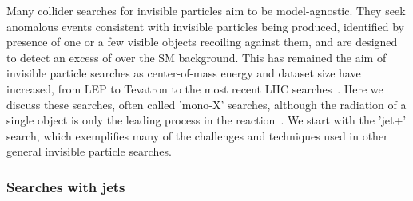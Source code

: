 

Many collider searches for invisible particles aim to be model-agnostic. They seek anomalous events consistent with invisible particles being produced, identified by presence of one or a few visible objects recoiling against them, and are designed to detect an excess of \MET over the SM background. 
This has remained the aim of invisible particle searches as center-of-mass energy and dataset size have increased, from LEP to Tevatron to the most recent LHC searches~\cite{Fox:2011fx,Beltran:2010ww,Bai:2010hh}.
Here we discuss these searches, often called 'mono-X' searches, although the radiation of a single object is only the leading process in the reaction~\cite{Haisch:2013ata}. 
We start with the 'jet+\MET' search, which exemplifies many of the challenges and techniques used in other general invisible particle searches.


\subsubsection{Searches with jets}



